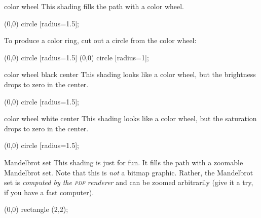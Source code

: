 \begin{shading}{color wheel}
\label{shading-color-wheel}%
    This shading fills the path with a color wheel.
\begin{codeexample}[preamble={\usepgflibrary{shadings}}]
\tikz \shade[shading=color wheel] (0,0) circle [radius=1.5];
\end{codeexample}
    To produce a color ring, cut out a circle from the color wheel:
\begin{codeexample}[preamble={\usepgflibrary{shadings}}]
\tikz {}
  (0,0) circle [radius=1.5]
  (0,0) circle [radius=1];
\end{codeexample}
\end{shading}

\begin{shading}{color wheel black center}
    This shading looks like a color wheel, but the brightness drops to zero in
    the center.
\begin{codeexample}[preamble={\usepgflibrary{shadings}}]
\tikz \shade[shading=color wheel black center] (0,0) circle [radius=1.5];
\end{codeexample}
\end{shading}

\begin{shading}{color wheel white center}
    This shading looks like a color wheel, but the saturation drops to zero in
    the center.
\begin{codeexample}[preamble={\usepgflibrary{shadings}}]
\tikz \shade[shading=color wheel white center] (0,0) circle [radius=1.5];
\end{codeexample}
\end{shading}

\makeatletter
\begin{shading}{Mandelbrot set}
    This shading is just for fun. It fills the path with a zoomable Mandelbrot
    set. Note that this is \emph{not} a bitmap graphic. Rather, the Mandelbrot
    set is \emph{computed by the \textsc{pdf} renderer} and can be zoomed
    arbitrarily (give it a try, if you have a fast computer).
\begin{codeexample}[preamble={\usepgflibrary{shadings}}]
\tikz \shade[shading=Mandelbrot set] (0,0) rectangle (2,2);
\end{codeexample}
\end{shading}
\makeatother

